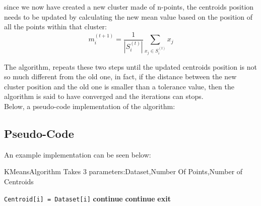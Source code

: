 \documentclass[10pt,twocolumn,letterpaper]{article}
\begin{document}
since we now have created a new cluster made of n-points, the centroids position needs to be updated by calculating the new mean value 
based on the position of all the points within that cluster:\newline
\begin{equation}
\label{eq:first}
m^{(t+1)}_i = \frac{1}{\left|S^{(t)}_i\right|} \sum_{x_j \in S^{(t)}_i} x_j 
\end{equation}  

The algorithm, repeats these two steps until the updated centroids position is not so much different from the old one, in fact, if the 
distance between the new cluster position and the old one is smaller than a tolerance value, then the algorithm is said to 
have converged and the iterations can stops.
\\
Below, a pseudo-code implementation of the algorithm:\\
\subsection{Pseudo-Code}
An example implementation can be seen below:
\begin{algorithm}
\caption{KMeansAlgorithm\newline
Takes 3 parameters:Dataset,Number Of Points,Number of Centroids}\label{euclid}
\begin{algorithmic}[1]
        \State \texttt{Centroid[i] = Dataset[i]}
    \EndFor
        			\EndIf
    			\EndFor
    		\EndFor
    					\State \textbf{continue}
        			\EndIf
    			\EndFor
    				\State \textbf{continue}
        		\EndIf
    		\EndFor
    			\State \textbf{exit}
        	\EndIf
    \EndWhile
\EndProcedure
\end{algorithmic}
\end{algorithm}
\newpage
\end{document}
